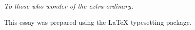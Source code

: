 
\begin {flushright}
\null {}
\textit{
To those who wonder of the extra-ordinary.
}
\null

This essay was prepared using the \LaTeX{} typesetting package.

\end {flushright}


